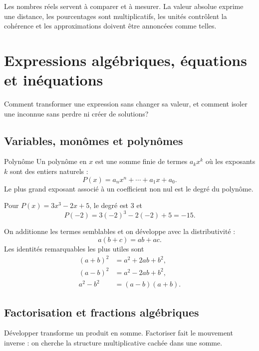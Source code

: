 \documentclass[12pt,a4paper,openany]{book}
\begin{document}
\begin{summarybox}
Les nombres réels servent à comparer et à mesurer. La valeur absolue exprime une distance, les pourcentages sont multiplicatifs, les unités contrôlent la cohérence et les approximations doivent être annoncées comme telles.
\end{summarybox}


\chapter{Expressions algébriques, équations et inéquations}

\begin{questionbox}
Comment transformer une expression sans changer sa valeur, et comment isoler une inconnue sans perdre ni créer de solutions?
\end{questionbox}

\section{Variables, monômes et polynômes}

\begin{definition}{Polynôme}{}
Un polynôme en $x$ est une somme finie de termes $a_kx^k$ où les exposants $k$ sont des entiers naturels :
\[
P(x)=a_nx^n+\cdots+a_1x+a_0.
\]
Le plus grand exposant associé à un coefficient non nul est le degré du polynôme.
\end{definition}

\begin{examplebox}
Pour $P(x)=3x^3-2x+5$, le degré est $3$ et
\[
P(-2)=3(-2)^3-2(-2)+5=-15.
\]
\end{examplebox}

On additionne les termes semblables et on développe avec la distributivité :
\[
a(b+c)=ab+ac.
\]
Les identités remarquables les plus utiles sont
\begin{align*}
(a+b)^2&=a^2+2ab+b^2,\\
(a-b)^2&=a^2-2ab+b^2,\\
a^2-b^2&=(a-b)(a+b).
\end{align*}

\section{Factorisation et fractions algébriques}

\begin{intuitionbox}
Développer transforme un produit en somme. Factoriser fait le mouvement inverse : on cherche la structure multiplicative cachée dans une somme.
\end{intuitionbox}
\end{document}
